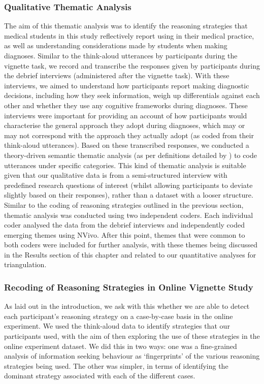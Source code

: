 \documentclass[a4paper, nobind]{templates/ociamthesis}
\begin{document}
\subsubsection{Qualitative Thematic Analysis}\label{qualitative-thematic-analysis}

The aim of this thematic analysis was to identify the reasoning strategies that medical students in this study reflectively report using in their medical practice, as well as understanding considerations made by students when making diagnoses. Similar to the think-aloud utterances by participants during the vignette task, we record and transcribe the responses given by participants during the debrief interviews (administered after the vignette task). With these interviews, we aimed to understand how participants report making diagnostic decisions, including how they seek information, weigh up differentials against each other and whether they use any cognitive frameworks during diagnoses. These interviews were important for providing an account of how participants would characterise the general approach they adopt during diagnoses, which may or may not correspond with the approach they actually adopt (as coded from their think-aloud utterances). Based on these transcribed responses, we conducted a theory-driven semantic thematic analysis (as per definitions detailed by \autocite{braun_using_2006}) to code utterances under specific categories. This kind of thematic analysis is suitable given that our qualitative data is from a semi-structured interview with predefined research questions of interest (whilst allowing participants to deviate slightly based on their responses), rather than a dataset with a looser structure. Similar to the coding of reasoning strategies outlined in the previous section, thematic analysis was conducted using two independent coders. Each individual coder analysed the data from the debrief interviews and independently coded emerging themes using NVivo. After this point, themes that were common to both coders were included for further analysis, with these themes being discussed in the Results section of this chapter and related to our quantitative analyses for triangulation.

\subsubsection{Recoding of Reasoning Strategies in Online Vignette Study}\label{recoding-of-reasoning-strategies-in-online-vignette-study}

As laid out in the introduction, we ask with this whether we are able to detect each participant's reasoning strategy on a case-by-case basis in the online experiment. We used the think-aloud data to identify strategies that our participants used, with the aim of then exploring the use of these strategies in the online experiment dataset. We did this in two ways: one was a fine-grained analysis of information seeking behaviour as `fingerprints' of the various reasoning strategies being used. The other was simpler, in terms of identifying the dominant strategy associated with each of the different cases.
\end{document}
